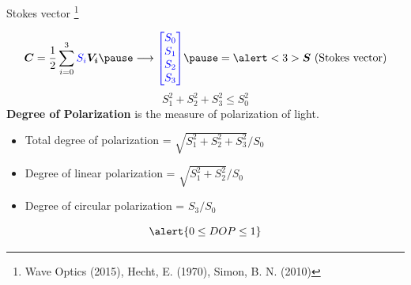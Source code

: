 \documentclass[12pt, dvipsnames]{beamer}
\numberwithin{equation}{section}
\newcommand\blfootnote[1]{%
	\begingroup
	\renewcommand\thefootnote{}\footnote{#1}%
	\addtocounter{footnote}{-1}%
	\endgroup
}
\begin{document}

\begin{frame}[t]{Stokes vector}\blfootnote{Wave Optics (2015), Hecht, E. (1970),  Simon, B. N. (2010) }
	$$\boldsymbol{C} = \frac{1}{2} \sum_{i=0}^{3} {\color{blue}S_i} \boldsymbol{V_i}\pause \longrightarrow {\color{blue}\begin{bmatrix} S_0\\ S_1\\ S_2\\S_3\end{bmatrix}}\pause = \alert<3>{\boldsymbol{S} \text{ (Stokes vector)}}$$\pause
	\alert<4,10>{$$S_1^2+S_2^2+S_3^2\le S_0^2$$}\pause
	\textbf{Degree of Polarization} \pause is the measure of polarization of light.\pause
	
	\begin{itemize}
		\item Total degree of polarization = $\sqrt{S_1^2+S_2^2+S_3^2}/S_0$\pause
		\item Degree of linear polarization = $\sqrt{S_1^2+S_2^2}/S_0$\pause
		\item Degree of circular polarization = $S_3/S_0$\pause
	\end{itemize}
	$$\alert{0\le DOP\le1}$$
	
\end{frame}
\end{document}
